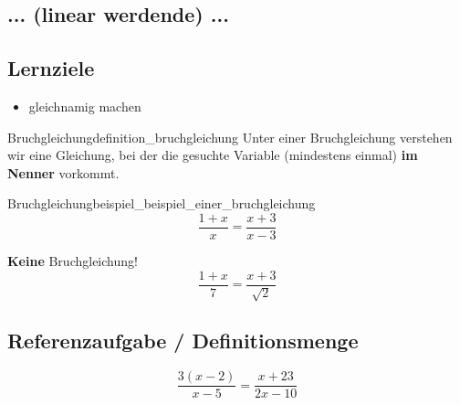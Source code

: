 
\subsection{... (linear werdende) ...}




\subsection*{Lernziele}

\begin{itemize}
	\item gleichnamig machen
\end{itemize}

\begin{definition}{Bruchgleichung}{definition_bruchgleichung}
  Unter einer Bruchgleichung verstehen wir eine Gleichung, bei der die
  gesuchte Variable (mindestens einmal) \textbf{im Nenner} vorkommt.
\end{definition}

\begin{beispiel}{Bruchgleichung}{beispiel_beispiel_einer_bruchgleichung}
$$\frac{1+x}{x}=\frac{x+3}{x-3}$$
\end{beispiel}

\begin{bemerkung}{\textbf{Keine} Bruchgleichung!}{}
  $$\frac{1+x}7=\frac{x+3}{\sqrt{2}}$$
  \end{bemerkung}
\newpage

\subsection{Referenzaufgabe / Definitionsmenge}

$$\frac{3(x-2)}{x-5} = \frac{x+23}{2x-10}$$

